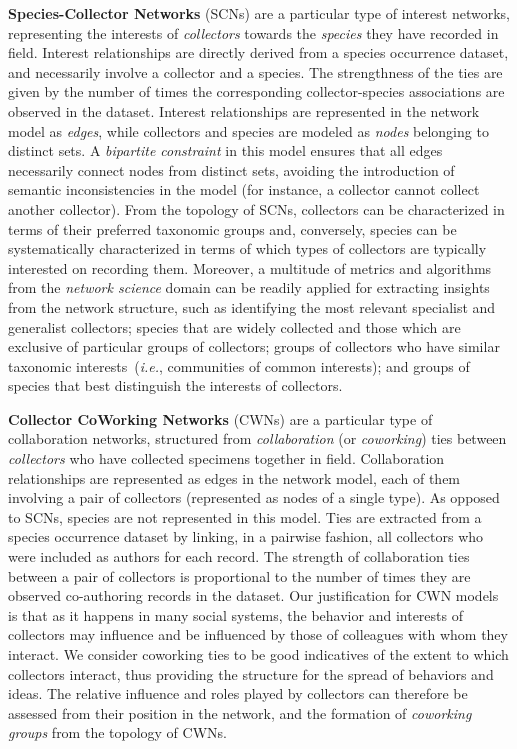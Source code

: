 \textbf{Species-Collector Networks} (SCNs) are a particular type of interest networks, representing the interests of \textit{collectors} towards the \textit{species} they have recorded in field.
Interest relationships are directly derived from a species occurrence dataset, and necessarily involve a collector and a species.
The strengthness of the ties are given by the number of times the corresponding collector-species associations are observed in the dataset.
Interest relationships are represented in the network model as \textit{edges}, while collectors and species are modeled as \textit{nodes} belonging to distinct sets.
A \textit{bipartite constraint} in this model ensures that all edges necessarily connect nodes from distinct sets, avoiding the introduction of semantic inconsistencies in the model (for instance, a collector cannot collect another collector).
%
From the topology of SCNs, collectors can be characterized in terms of their preferred taxonomic groups and, conversely, species can be systematically characterized in terms of which types of collectors are typically interested on recording them.
Moreover, a multitude of metrics and algorithms from the \textit{network science} domain can be readily applied for extracting insights from the network structure, such as identifying
the most relevant specialist and generalist collectors; 
species that are widely collected and those which are exclusive of particular groups of collectors; 
groups of collectors who have similar taxonomic interests~(\textit{i.e.}, communities of common interests); and 
groups of species that best distinguish the interests of collectors.


\textbf{Collector CoWorking Networks} (CWNs) are a particular type of collaboration networks, structured from \textit{collaboration} (or \textit{coworking}) ties between \textit{collectors} who have collected specimens together in field.
Collaboration relationships are represented as edges in the network model, each of them involving a pair of collectors (represented as nodes of a single type).
As opposed to SCNs, species are not represented in this model.
Ties are extracted from a species occurrence dataset by linking, in a pairwise fashion, all collectors who were included as authors for each record.
The strength of collaboration ties between a pair of collectors is proportional to the number of times they are observed co-authoring records in the dataset.
%
Our justification for CWN models is that as it happens in many social systems, the behavior and interests of collectors may influence and be influenced by those of colleagues with whom they interact.
We consider coworking ties to be good indicatives of the extent to which collectors interact, thus providing the structure for the spread of behaviors and ideas.
The relative influence and roles played by collectors can therefore be assessed from their position in the network, and the formation of \textit{coworking groups} from the topology of CWNs. 

